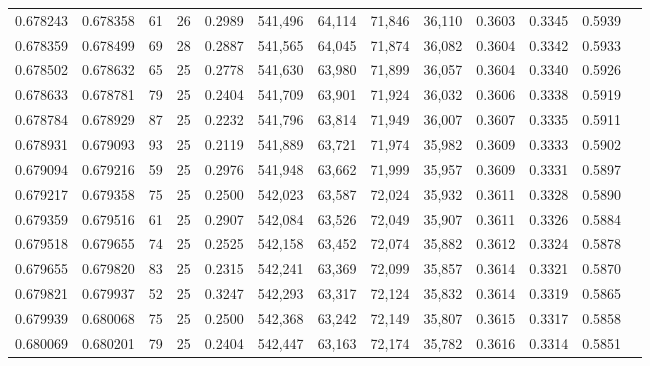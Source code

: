 \begin{tabular}{rrrrrrrrrrrrr}
0.678243 & 0.678358 &    61 &  26 &                                     0.2989 & 541,496 &  64,114 &  71,846 &  36,110 & 0.3603 & 0.3345 & 0.5939 \\
0.678359 & 0.678499 &    69 &  28 &                                     0.2887 & 541,565 &  64,045 &  71,874 &  36,082 & 0.3604 & 0.3342 & 0.5933 \\
0.678502 & 0.678632 &    65 &  25 &                                     0.2778 & 541,630 &  63,980 &  71,899 &  36,057 & 0.3604 & 0.3340 & 0.5926 \\
0.678633 & 0.678781 &    79 &  25 &                                     0.2404 & 541,709 &  63,901 &  71,924 &  36,032 & 0.3606 & 0.3338 & 0.5919 \\
0.678784 & 0.678929 &    87 &  25 &                                     0.2232 & 541,796 &  63,814 &  71,949 &  36,007 & 0.3607 & 0.3335 & 0.5911 \\
0.678931 & 0.679093 &    93 &  25 &                                     0.2119 & 541,889 &  63,721 &  71,974 &  35,982 & 0.3609 & 0.3333 & 0.5902 \\
0.679094 & 0.679216 &    59 &  25 &                                     0.2976 & 541,948 &  63,662 &  71,999 &  35,957 & 0.3609 & 0.3331 & 0.5897 \\
0.679217 & 0.679358 &    75 &  25 &                                     0.2500 & 542,023 &  63,587 &  72,024 &  35,932 & 0.3611 & 0.3328 & 0.5890 \\
0.679359 & 0.679516 &    61 &  25 &                                     0.2907 & 542,084 &  63,526 &  72,049 &  35,907 & 0.3611 & 0.3326 & 0.5884 \\
0.679518 & 0.679655 &    74 &  25 &                                     0.2525 & 542,158 &  63,452 &  72,074 &  35,882 & 0.3612 & 0.3324 & 0.5878 \\
0.679655 & 0.679820 &    83 &  25 &                                     0.2315 & 542,241 &  63,369 &  72,099 &  35,857 & 0.3614 & 0.3321 & 0.5870 \\
0.679821 & 0.679937 &    52 &  25 &                                     0.3247 & 542,293 &  63,317 &  72,124 &  35,832 & 0.3614 & 0.3319 & 0.5865 \\
0.679939 & 0.680068 &    75 &  25 &                                     0.2500 & 542,368 &  63,242 &  72,149 &  35,807 & 0.3615 & 0.3317 & 0.5858 \\
0.680069 & 0.680201 &    79 &  25 &                                     0.2404 & 542,447 &  63,163 &  72,174 &  35,782 & 0.3616 & 0.3314 & 0.5851 \\

\end{tabular}
